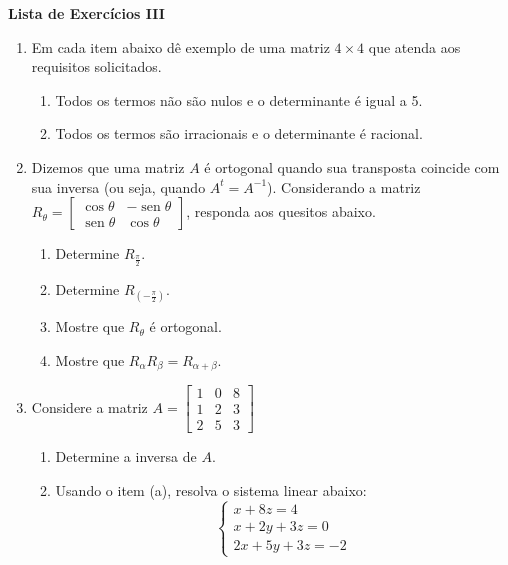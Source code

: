 \documentclass[12pt,a4paper]{article}
\DeclareMathOperator{\sen}{sen}
\begin{document}
\begin{center}
  \textbf{Lista de Exercícios III}
\end{center}

\begin{enumerate}
  \item Em cada item abaixo dê exemplo de uma matriz $4\times 4$ que atenda aos requisitos solicitados.
    \begin{enumerate}
      \item Todos os termos não são nulos e o determinante é igual a 5.
      \item Todos os termos são irracionais e o determinante é racional.
    \end{enumerate}

  \item Dizemos que uma matriz $A$ é ortogonal quando sua transposta coincide
    com sua inversa (ou seja, quando $A^t= A^{-1}$). Considerando a matriz
    $R_\theta=
      \begin{bmatrix}
        \cos \theta & -\sen \theta  \\
        \sen \theta & \cos \theta
      \end{bmatrix}$,
    responda aos quesitos abaixo.

    \begin{enumerate}
      \item Determine $R_{\frac{\pi}{2}}$.
      \item Determine $R_{\left(-\frac{\pi}{2}\right)}$.
      \item Mostre que $R_\theta$ é ortogonal.
      \item Mostre que $R_\alpha R_{\beta}=R_{\alpha +\beta}$.
    \end{enumerate}

  \item Considere a matriz
    $A=
      \begin{bmatrix}
        1 & 0 & 8 \\
        1 & 2 & 3 \\
        2 & 5 & 3
      \end{bmatrix}$

    \begin{enumerate}
      \item Determine a inversa de $A$.
      \item Usando o item (a), resolva o sistema linear abaixo:
      $$\begin{cases}
        x +  8 z  =  4\\
        x  +  2y  +  3z  =  0\\
        2x  +  5y  +  3z  =  -2
      \end{cases}$$
    \end{enumerate}


\end{enumerate}
\end{document}
